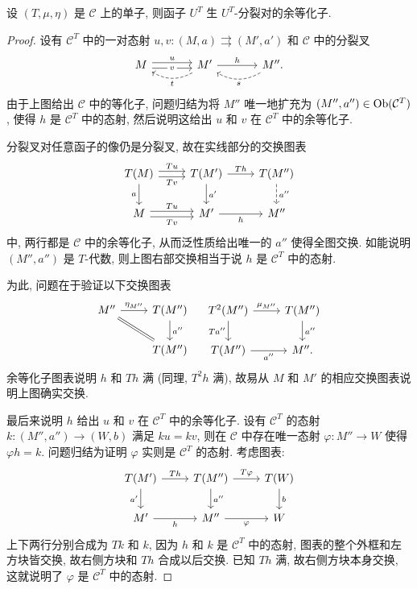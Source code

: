 \begin{lemma}\label{prop:UT-split-fork}
	设 $(T, \mu, \eta)$ 是 $\mathcal{C}$ 上的单子, 则函子 $U^T$ 生 $U^T$-分裂对的余等化子.
\end{lemma}
\begin{proof}
	设有 $\mathcal{C}^T$ 中的一对态射 $u, v: (M, a) \rightrightarrows (M', a')$ 和 $\mathcal{C}$ 中的分裂叉
	\begin{equation*}\begin{tikzcd}[column sep=large]
		M \arrow[shift left, r, "u"] \arrow[shift right, r, "v" description] & M' \arrow[r, "h"] \arrow[dashed, l, bend left, "t"] & M'' \arrow[dashed, l, bend left, "s"].
	\end{tikzcd}\end{equation*}
	由于上图给出 $\mathcal{C}$ 中的等化子, 问题归结为将 $M''$ 唯一地扩充为 $(M'', a'') \in \operatorname{Ob}(\mathcal{C}^T)$, 使得 $h$ 是 $\mathcal{C}^T$ 中的态射, 然后说明这给出 $u$ 和 $v$ 在 $\mathcal{C}^T$ 中的余等化子.
	
	分裂叉对任意函子的像仍是分裂叉, 故在实线部分的交换图表
	\[\begin{tikzcd}
		T(M) \arrow[shift left, r, "Tu"] \arrow[shift right, r, "Tv"'] \arrow[d, "a"'] & T(M') \arrow[r, "Th"] \arrow[d, "{a'}"] & T(M'') \arrow[dashed, d, "{a''}"] \\
		M \arrow[shift left, r, "Tu"] \arrow[shift right, r, "Tv"'] & M' \arrow[r, "h"'] & M''
	\end{tikzcd}\]
	中, 两行都是 $\mathcal{C}$ 中的余等化子, 从而泛性质给出唯一的 $a''$ 使得全图交换. 如能说明 $(M'', a'')$ 是 $T$-代数, 则上图右部交换相当于说 $h$ 是 $\mathcal{C}^T$ 中的态射.
	
	为此, 问题在于验证以下交换图表
	\[\begin{tikzcd}
		M'' \arrow[r, "{\eta_{M''}}"] \arrow[equal, rd] & T(M'') \arrow[d, "{a''}"] \\
		& T(M'')
	\end{tikzcd} \quad
	\begin{tikzcd}
		T^2(M'') \arrow[r, "{\mu_{M''}}"] \arrow[d, "{Ta''}"'] & T(M'') \arrow[d, "{a''}"] \\
		T(M'') \arrow[r, "{a''}"'] & M'' .
	\end{tikzcd}\]
	余等化子图表说明 $h$ 和 $Th$ 满 (同理, $T^2 h$ 满), 故易从 $M$ 和 $M'$ 的相应交换图表说明上图确实交换.
	
	最后来说明 $h$ 给出 $u$ 和 $v$ 在 $\mathcal{C}^T$ 中的余等化子. 设有 $\mathcal{C}^T$ 的态射 $k: (M'', a'') \to (W, b)$ 满足 $ku = kv$, 则在 $\mathcal{C}$ 中存在唯一态射 $\varphi: M'' \to W$ 使得 $\varphi h = k$. 问题归结为证明 $\varphi$ 实则是 $\mathcal{C}^T$ 的态射. 考虑图表:
	\[\begin{tikzcd}
		T(M') \arrow[r, "Th"] \arrow[d, "{a'}"'] & T(M'') \arrow[r, "T\varphi"] \arrow[d, "{a''}"] & T(W) \arrow[d, "b"] \\
		M' \arrow[r, "h"'] & M'' \arrow[r, "\varphi"'] & W
	\end{tikzcd}\]
	上下两行分别合成为 $Tk$ 和 $k$, 因为 $h$ 和 $k$ 是 $\mathcal{C}^T$ 中的态射, 图表的整个外框和左方块皆交换, 故右侧方块和 $Th$ 合成以后交换. 已知 $Th$ 满, 故右侧方块本身交换, 这就说明了 $\varphi$ 是 $\mathcal{C}^T$ 中的态射.
\end{proof}

